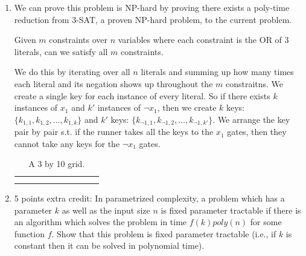 \documentclass[12pt]{article}
\begin{document}
\begin{enumerate}
\item We can prove this problem is NP-hard by proving there exists a poly-time reduction from 3-SAT, a proven NP-hard problem, to the current problem.

Given $m$ constraints over $n$ variables where each constraint is the OR of $3$ literals, can we satisfy all $m$ constraints.

We do this by iterating over all $n$ literals and summing up how many times each literal and its negation shows up throughout the $m$ constraitns. We create a single key for each instance of every literal. So if there exists $k$ instances of $x_1$ and $k'$ instances of $\neg x_1$, then we create $k$ keys: $\{k_{1,1}, k_{1,2}, \dots, k_{1,k}\}$ and $k'$ keys: $\{k_{\neg1,1}, k_{\neg1,2}, \dots, k_{\neg1,k'}\}$. We arrange the key pair by pair s.t. if the runner takes all the keys to the $x_1$ gates, then they cannot take any keys for the $\neg x_1$ gates.

\begin{table}[h]
\centering
\caption{A 3 by 10 grid.}
\begin{tabular}{|c|c|c|c|c|c|c|c|c|c|}
\hline
 &  &  &  &  &  &  &  &  &  \\
\hline
 &  &  &  &  &  &  &  &  &  \\
\hline
 &  &  &  &  &  &  &  &  &  \\
\hline
\end{tabular}
\end{table}


\item 5 points extra credit: In parametrized complexity, a problem which has a parameter $k$ as well as the input size $n$ is fixed parameter tractable if there is an algorithm which solves the problem in time $f(k)poly(n)$ for some function $f$. Show that this problem is fixed parameter tractable (i.e., if $k$ is constant then it can be solved in polynomial time).
\end{enumerate}
\end{document}
